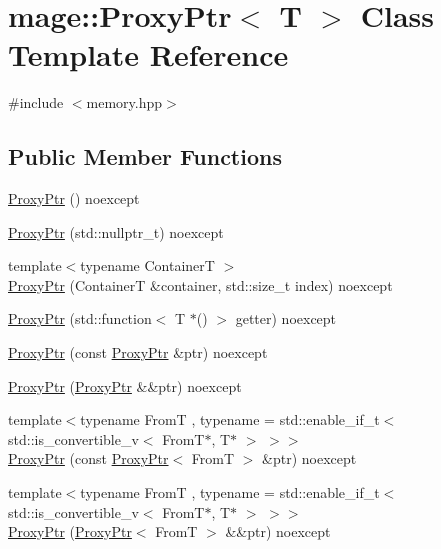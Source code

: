 \hypertarget{classmage_1_1_proxy_ptr}{}\section{mage\+:\+:Proxy\+Ptr$<$ T $>$ Class Template Reference}
\label{classmage_1_1_proxy_ptr}


{\ttfamily \#include $<$memory.\+hpp$>$}

\subsection*{Public Member Functions}
\begin{DoxyCompactItemize}
\item 
\mbox{\hyperlink{classmage_1_1_proxy_ptr_a6fadf61cdc71e1d6bc9ac666eda5d2c6}{Proxy\+Ptr}} () noexcept
\item 
\mbox{\hyperlink{classmage_1_1_proxy_ptr_aaad9140d67d5c0a8694e94973234676a}{Proxy\+Ptr}} (std\+::nullptr\+\_\+t) noexcept
\item 
{\footnotesize template$<$typename ContainerT $>$ }\\\mbox{\hyperlink{classmage_1_1_proxy_ptr_a72b18a0a5c86275ca4c033d7a975ff67}{Proxy\+Ptr}} (ContainerT \&container, std\+::size\+\_\+t index) noexcept
\item 
\mbox{\hyperlink{classmage_1_1_proxy_ptr_a964d48ac831c8c179edca90bdfcc5b0b}{Proxy\+Ptr}} (std\+::function$<$ T $\ast$() $>$ getter) noexcept
\item 
\mbox{\hyperlink{classmage_1_1_proxy_ptr_aa31b385e10ba8ab7ce91791078e9ed6d}{Proxy\+Ptr}} (const \mbox{\hyperlink{classmage_1_1_proxy_ptr}{Proxy\+Ptr}} \&ptr) noexcept
\item 
\mbox{\hyperlink{classmage_1_1_proxy_ptr_a51e4a025cd9ca419a2c4b687b4c430bb}{Proxy\+Ptr}} (\mbox{\hyperlink{classmage_1_1_proxy_ptr}{Proxy\+Ptr}} \&\&ptr) noexcept
\item 
{\footnotesize template$<$typename FromT , typename  = std\+::enable\+\_\+if\+\_\+t$<$ std\+::is\+\_\+convertible\+\_\+v$<$ From\+T$\ast$, T$\ast$ $>$ $>$$>$ }\\\mbox{\hyperlink{classmage_1_1_proxy_ptr_a0356f4ad5f0a6e08baf29bc9239d317c}{Proxy\+Ptr}} (const \mbox{\hyperlink{classmage_1_1_proxy_ptr}{Proxy\+Ptr}}$<$ FromT $>$ \&ptr) noexcept
\item 
{\footnotesize template$<$typename FromT , typename  = std\+::enable\+\_\+if\+\_\+t$<$ std\+::is\+\_\+convertible\+\_\+v$<$ From\+T$\ast$, T$\ast$ $>$ $>$$>$ }\\\mbox{\hyperlink{classmage_1_1_proxy_ptr_aab3e1b95156a5b52b47db4d2f4176e37}{Proxy\+Ptr}} (\mbox{\hyperlink{classmage_1_1_proxy_ptr}{Proxy\+Ptr}}$<$ FromT $>$ \&\&ptr) noexcept

\end{DoxyCompactItemize}
